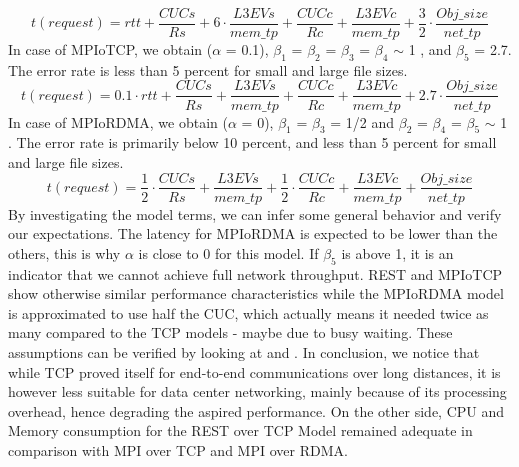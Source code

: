 \documentclass[runningheads]{llncs}
\begin{document}
\begin{equation}
\label{eq:model-rest}
t(request)=rtt+\frac{CUCs}{Rs}+6\cdot\frac{L3EVs}{mem\_tp}+\frac{CUCc}{Rc}+\frac{L3EVc}{mem\_tp}+\frac{3}{2}\cdot\frac{Obj\_size}{net\_tp}
\end{equation}
In case of MPIoTCP, we obtain ($\alpha$ = 0.1), $\beta_1$ = $\beta_2$ = $\beta_3$ = $\beta_4$ $\sim$ 1 , and $\beta_5$ = 2.7. The error rate is less than 5 percent for small and large file sizes.
\begin{equation}
\label{eq:model-rest}
t(request)=0.1\cdot rtt+\frac{CUCs}{Rs}+\frac{L3EVs}{mem\_tp}+\frac{CUCc}{Rc}+\frac{L3EVc}{mem\_tp}+2.7\cdot\frac{Obj\_size}{net\_tp}
\end{equation}
In case of MPIoRDMA, we obtain ($\alpha$ = 0), $\beta_1$ = $\beta_3$ = 1/2 and  $\beta_2$ = $\beta_4$ = $\beta_5$ $\sim$ 1 . The error rate is primarily below 10 percent, and less than 5 percent for small and large file sizes.
\begin{equation}
\label{eq:model-rest}
t(request)=\frac{1}{2}\cdot\frac{CUCs}{Rs}+\frac{L3EVs}{mem\_tp}+\frac{1}{2}\cdot\frac{CUCc}{Rc}+\frac{L3EVc}{mem\_tp}+\frac{Obj\_size}{net\_tp}
\end{equation}
By investigating the model terms, we can infer some general behavior and verify our expectations. The latency for MPIoRDMA is expected to be lower than the others, this  is why $\alpha$ is close to 0 for this model. If $\beta_5$ is above 1, it is an indicator that we cannot achieve full network throughput. REST and MPIoTCP show otherwise similar performance characteristics while the MPIoRDMA model is approximated to use half the CUC, which actually means it needed twice as many compared to the TCP models - maybe due to busy waiting. These assumptions can be verified by looking at  and .
In conclusion, we notice that while TCP proved itself for end-to-end communications over long distances, it is however less suitable for data center networking, mainly because of its processing overhead, hence degrading the aspired performance. On the other side, CPU and Memory consumption for the REST over TCP Model remained adequate in comparison with MPI over TCP and MPI over RDMA.
\end{document}
